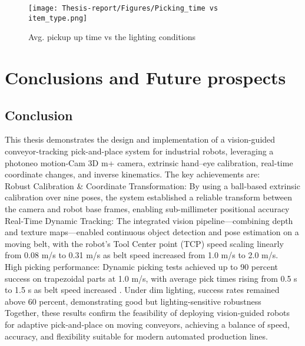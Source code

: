 \documentclass[12pt]{article}
\begin{document}
\begin{figure}[h]
    \centering
    \texttt{[image: Thesis-report/Figures/Picking\_time vs item\_type.png]}
    \caption{Avg. pickup up time vs the lighting conditions \cite{ref22}}
    \label{fig1.Photoneo Cmaera}
\end{figure}

\newpage
\section{Conclusions and Future prospects}
\label{Conclusion}

\subsection{Conclusion}
    
This thesis demonstrates the design and implementation of a vision-guided conveyor-tracking pick-and-place system for industrial robots, leveraging a photoneo motion-Cam 3D m+ camera, extrinsic hand–eye calibration, real-time coordinate changes, and inverse kinematics. The key achievements are:\\

Robust Calibration \& Coordinate Transformation: By using a ball-based extrinsic calibration over nine poses, the system established a reliable transform between the camera and robot base frames, enabling sub-millimeter positional accuracy\\


Real-Time Dynamic Tracking: The integrated vision pipeline—combining depth and texture maps—enabled continuous object detection and pose estimation on a moving belt, with the robot’s Tool Center point (TCP) speed scaling linearly from 0.08 m/s to 0.31 m/s as belt speed increased from 1.0 m/s to 2.0 m/s.\\


High picking performance: Dynamic picking tests achieved up to 90 percent success on trapezoidal parts at 1.0 m/s, with average pick times rising from 0.5 s to 1.5 s as belt speed increased 
. Under dim lighting, success rates remained above 60 percent, demonstrating good but lighting-sensitive robustness\\

Together, these results confirm the feasibility of deploying vision‑guided robots for adaptive pick‑and‑place on moving conveyors, achieving a balance of speed, accuracy, and flexibility suitable for modern automated production lines.
\newpage
\end{document}
